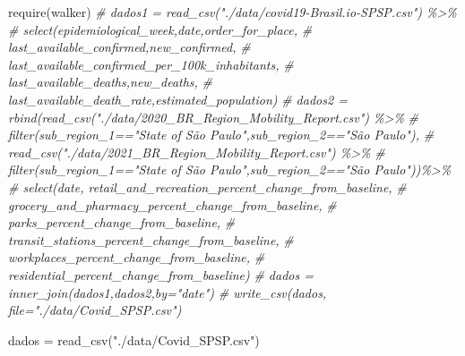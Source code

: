\documentclass[
]{book}
\newenvironment{Shaded}{\begin{snugshade}}{\end{snugshade}}
\newcommand{\CommentTok}[1]{\textcolor[rgb]{0.56,0.35,0.01}{\textit{#1}}}
\newcommand{\FunctionTok}[1]{\textcolor[rgb]{0.00,0.00,0.00}{#1}}
\newcommand{\NormalTok}[1]{#1}
\newcommand{\OtherTok}[1]{\textcolor[rgb]{0.56,0.35,0.01}{#1}}
\newcommand{\StringTok}[1]{\textcolor[rgb]{0.31,0.60,0.02}{#1}}
\begin{document}
\begin{Shaded}
\begin{Highlighting}[]
\FunctionTok{require}\NormalTok{(walker)}
\CommentTok{\# dados1 = read\_csv("./data/covid19{-}Brasil.io{-}SPSP.csv") \%\textgreater{}\% }
\CommentTok{\#   select(epidemiological\_week,date,order\_for\_place,}
\CommentTok{\#          last\_available\_confirmed,new\_confirmed,}
\CommentTok{\#          last\_available\_confirmed\_per\_100k\_inhabitants,}
\CommentTok{\#          last\_available\_deaths,new\_deaths,}
\CommentTok{\#          last\_available\_death\_rate,estimated\_population)}
\CommentTok{\# dados2 = rbind(read\_csv("./data/2020\_BR\_Region\_Mobility\_Report.csv") \%\textgreater{}\% }
\CommentTok{\#     filter(sub\_region\_1=="State of São Paulo",sub\_region\_2=="São Paulo"),}
\CommentTok{\#    read\_csv("./data/2021\_BR\_Region\_Mobility\_Report.csv") \%\textgreater{}\% }
\CommentTok{\#     filter(sub\_region\_1=="State of São Paulo",sub\_region\_2=="São Paulo"))\%\textgreater{}\%}
\CommentTok{\#   select(date, retail\_and\_recreation\_percent\_change\_from\_baseline,}
\CommentTok{\#                grocery\_and\_pharmacy\_percent\_change\_from\_baseline,}
\CommentTok{\#                parks\_percent\_change\_from\_baseline,}
\CommentTok{\#                transit\_stations\_percent\_change\_from\_baseline,}
\CommentTok{\#                workplaces\_percent\_change\_from\_baseline,}
\CommentTok{\#                residential\_percent\_change\_from\_baseline)}
\CommentTok{\# dados = inner\_join(dados1,dados2,by="date")}
\CommentTok{\# write\_csv(dados, file="./data/Covid\_SPSP.csv")}

\NormalTok{dados }\OtherTok{=} \FunctionTok{read\_csv}\NormalTok{(}\StringTok{"./data/Covid\_SPSP.csv"}\NormalTok{)}


\end{Highlighting}
\end{Shaded}
\end{document}
